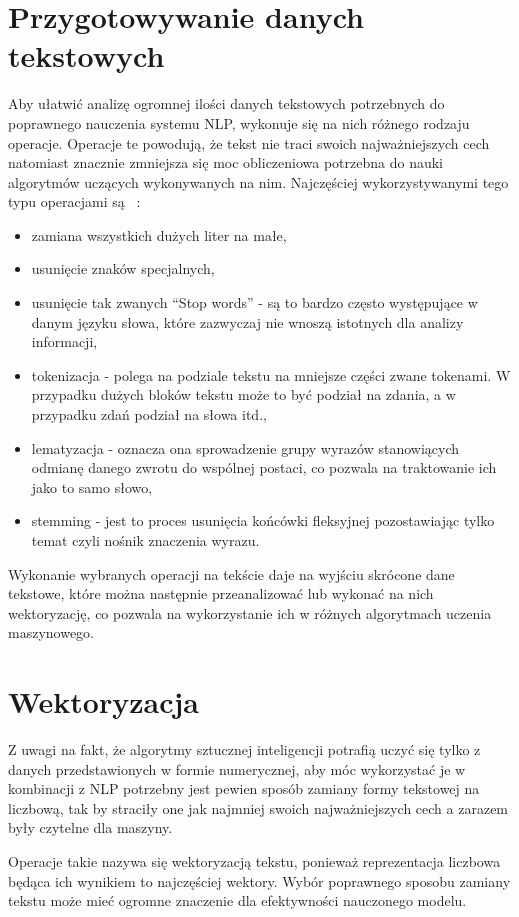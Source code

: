 \section{Przygotowywanie danych tekstowych}
Aby ułatwić analizę ogromnej ilości danych tekstowych potrzebnych do poprawnego nauczenia systemu NLP,
wykonuje się na nich różnego rodzaju operacje. Operacje te powodują, że tekst nie traci swoich najważniejszych cech 
natomiast znacznie zmniejsza się moc obliczeniowa potrzebna do nauki algorytmów uczących wykonywanych na nim. 
Najczęściej wykorzystywanymi tego typu operacjami są ~\cite{preprocessing}:
\begin{itemize}
    \item zamiana wszystkich dużych liter na małe,
    \item usunięcie znaków specjalnych,
    \item usunięcie tak zwanych ``Stop words'' - są to bardzo często występujące w danym języku słowa, które 
    zazwyczaj nie wnoszą istotnych dla analizy informacji,
    \item tokenizacja - polega na podziale tekstu na mniejsze części zwane tokenami. W przypadku dużych bloków 
    tekstu może to być podział na zdania, a w przypadku zdań podział na słowa itd.,
    \item lematyzacja - oznacza ona sprowadzenie grupy wyrazów stanowiących odmianę danego zwrotu do wspólnej postaci,
    co pozwala na traktowanie ich jako to samo słowo,
    \item stemming - jest to proces usunięcia końcówki fleksyjnej pozostawiając tylko temat czyli nośnik znaczenia 
    wyrazu.
\end{itemize}
Wykonanie wybranych operacji na tekście daje na wyjściu skrócone dane tekstowe, które można następnie przeanalizować lub 
wykonać na nich wektoryzację, co pozwala na wykorzystanie ich w różnych algorytmach uczenia maszynowego. 
\section{Wektoryzacja}
Z uwagi na fakt, że algorytmy sztucznej inteligencji potrafią uczyć się tylko z danych przedstawionych w formie numerycznej, aby móc 
wykorzystać je w kombinacji z NLP potrzebny jest pewien sposób zamiany formy tekstowej na liczbową, tak by straciły one jak najmniej
swoich najważniejszych cech a zarazem były czytelne dla maszyny. 

Operacje takie nazywa się wektoryzacją tekstu, ponieważ 
reprezentacja liczbowa będąca ich wynikiem to najczęściej wektory. 
Wybór poprawnego sposobu zamiany tekstu może mieć ogromne znaczenie dla efektywności nauczonego modelu.

